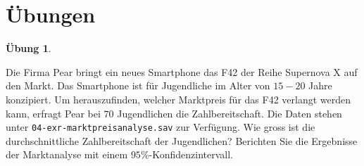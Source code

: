 \documentclass[
]{book}
\theoremstyle{definition}
\theoremstyle{definition}
\theoremstyle{definition}
\newtheorem{exercise}{Übung}[chapter]
\theoremstyle{definition}
\theoremstyle{remark}
\begin{document}
\section{Übungen}\label{uxfcbungen-1}

\begin{exercise}
\protect\hypertarget{exr:marktpreisanalyse}{}\label{exr:marktpreisanalyse}\leavevmode

Die Firma Pear bringt ein neues Smartphone das F42 der Reihe Supernova X auf den Markt. Das Smartphone ist für Jugendliche im Alter von \(15-20\) Jahre konzipiert. Um herauszufinden, welcher Marktpreis für das F42 verlangt werden kann, erfragt Pear bei \(70\) Jugendlichen die Zahlbereitschaft. Die Daten stehen unter \texttt{04-exr-marktpreisanalyse.sav} zur Verfügung. Wie gross ist die durchschnittliche Zahlbereitschaft der Jugendlichen? Berichten Sie die Ergebnisse der Marktanalyse mit einem \(95\%\)-Konfidenzintervall.

\end{exercise}
\end{document}
